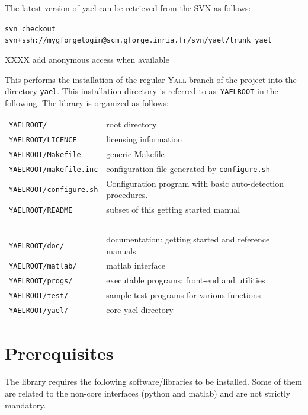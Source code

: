\documentclass[a4paper,11pt,notitlepage,final,twoside]{report}
\newcommand{\yael}{\textsc{Yael}\xspace}
\newcommand{\yroot}{\texttt{YAELROOT}\xspace}
\newcommand{\tc}[1]{\texttt{#1}}
\newcommand{\code}[1]{\smallskip 

\texttt{#1} 
 \medskip

}
\begin{document}
The latest version of yael can be retrieved from the SVN as follows:

\code{svn checkout svn+ssh://mygforgelogin@scm.gforge.inria.fr/svn/yael/trunk yael}


XXXX add anonymous access when available 

This performs the installation of the regular \yael branch of the project into the directory \texttt{yael}. 
This installation directory is referred to as~\yroot in the following. 
The library is organized as follows: 
\medskip

\begin{tabular}{ll}
\tc{\yroot/}         & root directory \\
\tc{\yroot/LICENCE}  & licensing information \\
\tc{\yroot/Makefile} & generic Makefile \\
\tc{\yroot/makefile.inc}  & configuration file generated by \tc{configure.sh}\\
\tc{\yroot/configure.sh}  & Configuration program with basic auto-detection procedures.  \\
\tc{\yroot/README}   & subset of this getting started manual \\
~\\
\tc{\yroot/doc/}     & documentation: getting started and reference manuals \\
\tc{\yroot/matlab/}  & matlab interface \\
\tc{\yroot/progs/}   & executable programs: front-end and utilities \\
\tc{\yroot/test/}    & sample test programs for various functions \\
\tc{\yroot/yael/}    & core yael directory  \\
\end{tabular}


\section{Prerequisites}

The library requires the following software/libraries to be installed. 
Some of them are related to the non-core interfaces (python and matlab) 
and are not strictly mandatory. 
\end{document}
